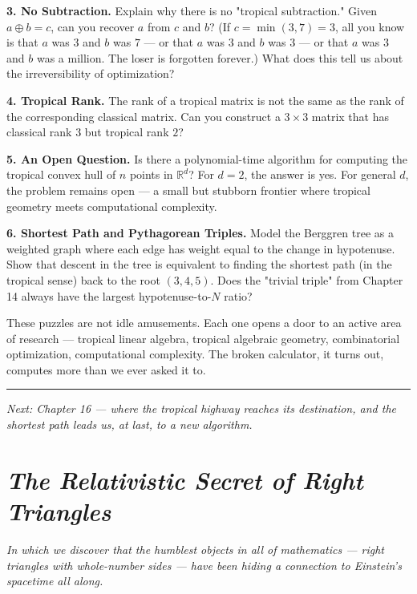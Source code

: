 \documentclass[11pt,openany]{book}
\theoremstyle{definition}
\theoremstyle{plain}
\theoremstyle{remark}
\begin{document}
\textbf{3. No Subtraction.} Explain why there is no "tropical subtraction." Given $a \oplus b = c$, can you recover $a$ from $c$ and $b$? (If $c = \min(3, 7) = 3$, all you know is that $a$ was $3$ and $b$ was $7$ — or that $a$ was $3$ and $b$ was $3$ — or that $a$ was $3$ and $b$ was a million. The loser is forgotten forever.) What does this tell us about the irreversibility of optimization?

\textbf{4. Tropical Rank.} The rank of a tropical matrix is not the same as the rank of the corresponding classical matrix. Can you construct a $3 \times 3$ matrix that has classical rank $3$ but tropical rank $2$?

\textbf{5. An Open Question.} Is there a polynomial-time algorithm for computing the tropical convex hull of $n$ points in $\mathbb{R}^d$? For $d = 2$, the answer is yes. For general $d$, the problem remains open — a small but stubborn frontier where tropical geometry meets computational complexity.

\textbf{6. Shortest Path and Pythagorean Triples.} Model the Berggren tree as a weighted graph where each edge has weight equal to the change in hypotenuse. Show that descent in the tree is equivalent to finding the shortest path (in the tropical sense) back to the root $(3, 4, 5)$. Does the "trivial triple" from Chapter 14 always have the largest hypotenuse-to-$N$ ratio?

These puzzles are not idle amusements. Each one opens a door to an active area of research — tropical linear algebra, tropical algebraic geometry, combinatorial optimization, computational complexity. The broken calculator, it turns out, computes more than we ever asked it to.

\bigskip\noindent\rule{\textwidth}{0.4pt}\bigskip


\textit{Next: Chapter 16 — where the tropical highway reaches its destination, and the shortest path leads us, at last, to a new algorithm.}

\clearpage

\chapter{\textit{The Relativistic Secret of Right Triangles}}



\textit{In which we discover that the humblest objects in all of mathematics — right triangles with whole-number sides — have been hiding a connection to Einstein's spacetime all along.}
\end{document}
